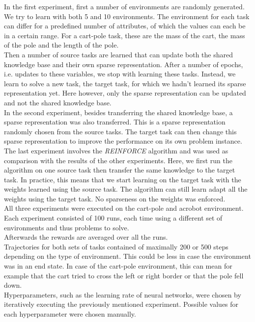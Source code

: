 In the first experiment, first a number of environments are randomly generated. We try to learn with both 5 and 10 environments.
The environment for each task can differ for a predefined number of attributes, of which the values can each be in a certain range. For a cart-pole task, these are the mass of the cart, the mass of the pole and the length of the pole.\\
Then a number of source tasks are learned that can update both the shared knowledge base and their own sparse representation.
After a number of epochs, i.e. updates to these variables, we stop with learning these tasks.
Instead, we learn to solve a new task, the target task, for which we hadn't learned its sparse representation yet. Here however, only the sparse representation can be updated and not the shared knowledge base.\\

In the second experiment, besides transferring the shared knowledge base, a sparse representation was also transferred.
This is a sparse representation randomly chosen from the source tasks.
The target task can then change this sparse representation to improve the performance on its own problem instance.\\

The last experiment involves the \textit{REINFORCE} algorithm and was used as comparison with the results of the other experiments.
Here, we first run the algorithm on one source task then transfer the same knowledge to the target task.
In practice, this means that we start learning on the target task with the weights learned using the source task.
The algorithm can still learn adapt all the weights using the target task.
No sparseness on the weights was enforced.\\

All three experiments were executed on the cart-pole and acrobot environment.
Each experiment consisted of 100 runs, each time using a different set of environments and thus problems to solve.\\
Afterwards the rewards are averaged over all the runs.\\
Trajectories for both sets of tasks contained of maximally 200 or 500 steps depending on the type of environment.
This could be less in case the environment was in an end state.
In case of the cart-pole environment, this can mean for example that the cart tried to cross the left or right border or that the pole fell down.\\
Hyperparameters, such as the learning rate of neural networks, were chosen by iteratively executing the previously mentioned experiment. Possible values for each hyperparameter were chosen manually.

